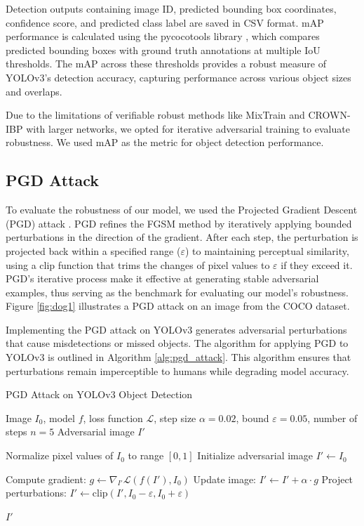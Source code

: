 \documentclass[10pt]{cai}
\begin{document}
Detection outputs containing image ID, predicted bounding box coordinates, confidence score, and predicted class label are saved in CSV format. mAP performance is calculated using the pycocotools library \cite{lin2015microsoft}, which compares predicted bounding boxes with ground truth annotations at multiple IoU thresholds. The mAP across these thresholds provides a robust measure of YOLOv3’s detection accuracy, capturing performance across various object sizes and overlaps.

Due to the limitations of verifiable robust methods like MixTrain and CROWN-IBP with larger networks, we opted for iterative adversarial training to evaluate robustness. We used mAP as the metric for object detection performance.

\subsection{PGD Attack}
To evaluate the robustness of our model, we used the Projected Gradient Descent (PGD) attack \cite{madry2019deeplearningmodelsresistant}. PGD refines the FGSM method by iteratively applying bounded perturbations in the direction of the gradient. After each step, the perturbation is projected back within a specified range ($\varepsilon$) to maintaining perceptual similarity, using a clip function that trims the changes of pixel values to $\varepsilon$ if they exceed it. PGD’s iterative process make it effective at generating stable adversarial examples, thus serving as the benchmark for evaluating our model's robustness. Figure \ref{fig:dog1} illustrates a PGD attack on an image from the COCO dataset.

Implementing the PGD attack on YOLOv3 generates adversarial perturbations that cause misdetections or missed objects. The algorithm for applying PGD to YOLOv3 is outlined in Algorithm \ref{alg:pgd_attack}. This algorithm ensures that perturbations remain imperceptible to humans while degrading model accuracy.

\begin{algorithm}
    \caption{PGD Attack on YOLOv3 Object Detection}
    \label{alg:pgd_attack}
    \begin{algorithmic}[1]
    \REQUIRE Image $I_0$, model $f$, loss function $\mathcal{L}$, step size $\alpha = 0.02$, bound $\varepsilon = 0.05$, number of steps $n = 5$
    \ENSURE Adversarial image $I'$
    
    \STATE Normalize pixel values of $I_0$ to range $[0, 1]$
    \STATE Initialize adversarial image $I' \gets I_0$
    
        \STATE Compute gradient: $g \gets \nabla_{I'} \mathcal{L}(f(I'), I_0)$
        \STATE Update image: $I' \gets I' + \alpha \cdot g$
        \STATE Project perturbations: $I' \gets \text{clip}(I', I_0 - \varepsilon, I_0 + \varepsilon)$
    \ENDFOR
    
    \RETURN $I'$
    \end{algorithmic}
\end{algorithm}
\end{document}
